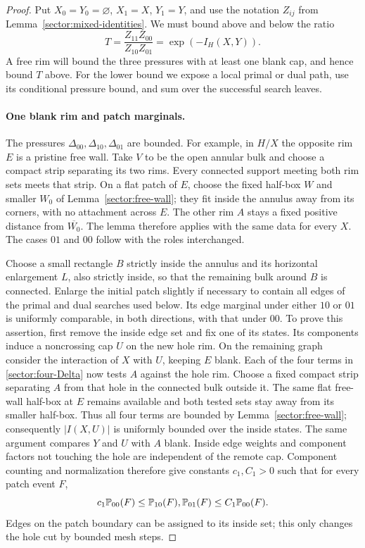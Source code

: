 \begin{proof}
Put $X_0=Y_0=\varnothing$, $X_1=X$, $Y_1=Y$, and use the notation
$Z_{ij}$ from Lemma~\ref{sector:mixed-identities}.  We must bound above
and below the ratio
\[
 T=\frac{Z_{11}Z_{00}}{Z_{10}Z_{01}}=\exp(-I_H(X,Y)).
\]
A free rim will bound the three pressures with at least one blank cap,
and hence bound $T$ above.  For the lower bound we expose a local primal
or dual path, use its conditional pressure bound, and sum over the
successful search leaves.

\paragraph{One blank rim and patch marginals.}
The pressures $\Delta_{00},\Delta_{10},\Delta_{01}$ are bounded.
For example, in $H/X$ the opposite rim $E$ is a pristine free wall.
Take $V$ to be the open annular bulk and choose a compact strip
separating its two rims.  Every connected support meeting both rim
sets meets that strip.  On a flat patch of $E$, choose the fixed
half-box $W$ and smaller $W_0$ of Lemma~\ref{sector:free-wall};
they fit inside the annulus away from its corners, with no attachment
across $E$.  The other rim $A$ stays a fixed positive distance from
$\overline{W_0}$.  The lemma therefore applies with the same data
for every $X$.  The cases $01$ and $00$ follow with the roles
interchanged.

Choose a small rectangle $B$ strictly inside the annulus and its
horizontal enlargement $L$, also strictly inside, so that the
remaining bulk around $B$ is connected.  Enlarge the initial patch
slightly if necessary to contain all edges of the primal and dual
searches used below.  Its edge marginal under either $10$ or $01$ is
uniformly comparable, in both directions, with that under $00$.
To prove this assertion, first remove the inside edge set and fix
one of its states.  Its components induce a noncrossing cap $U$ on
the new hole rim.  On the remaining graph consider the interaction
of $X$ with $U$, keeping $E$ blank.  Each of the four terms in
\eqref{sector:four-Delta} now tests $A$ against the hole rim.  Choose
a fixed compact strip separating $A$ from that hole in the connected
bulk outside it.  The same flat free-wall half-box at $E$ remains
available and both tested sets stay away from its smaller half-box.
Thus all four terms
are bounded by Lemma~\ref{sector:free-wall}; consequently
$|I(X,U)|$ is uniformly bounded over the inside states.  The same
argument compares $Y$ and $U$ with $A$ blank.  Inside edge weights
and component factors not touching the hole are independent of the
remote cap.  Component counting and normalization therefore give
constants $c_1,C_1>0$ such that for every patch event $F$,
\begin{equation}
 c_1\mathbb P_{00}(F)\le\mathbb P_{10}(F),\mathbb P_{01}(F)
 \le C_1\mathbb P_{00}(F).
 \label{sector:patch-marginals}
\end{equation}
Edges on the patch boundary can be assigned to its inside set; this
only changes the hole cut by bounded mesh steps.


\end{proof}
